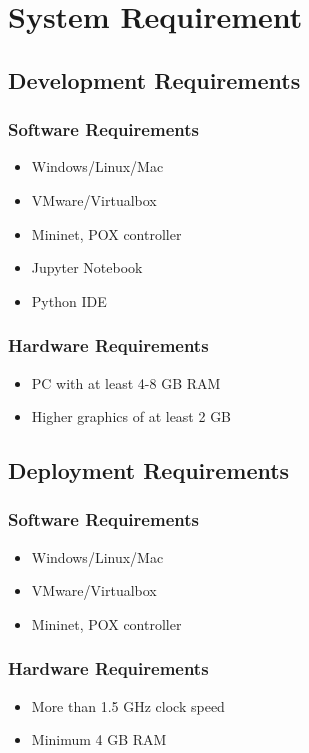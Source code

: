 \section{System Requirement}
\vspace{-18pt}
\subsection{Development Requirements}
\vspace{-18pt}
\subsubsection{Software Requirements}
\vspace{-10pt}
\begin{itemize} 
\item Windows/Linux/Mac
\item VMware/Virtualbox
\item Mininet, POX controller
\item Jupyter Notebook
\item Python IDE
\end{itemize}
\subsubsection{Hardware Requirements}
\vspace{-10pt}
\begin{itemize}
\item PC with at least 4-8 GB RAM
\item  Higher graphics of at least 2 GB
\end{itemize}
\subsection{Deployment Requirements}
\vspace{-18pt}
\subsubsection{Software Requirements}
\vspace{-10pt}
\begin{itemize}
\item Windows/Linux/Mac
\item VMware/Virtualbox
\item Mininet, POX controller
\end{itemize}
\vspace{-10pt}
\subsubsection{Hardware Requirements}
\vspace{-10pt}
\begin{itemize}
\item More than 1.5 GHz clock speed
\item Minimum 4 GB RAM
\end{itemize}
\label{tblSampleTable}
